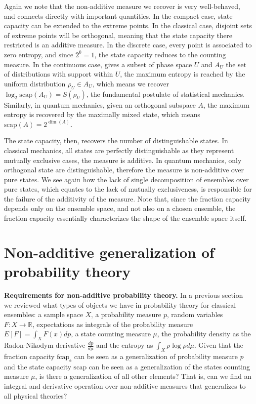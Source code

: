 \documentclass[10pt,twocolumn, nofootinbib]{revtex4-2}
\newcommand\capacity{\mathrm{scap}}
\newcommand\frcap{\mathrm{fcap}}
\newcommand{\ens}[1][e] {\mathsf{#1}} %
\begin{document}
Again we note that the non-additive measure we recover is very well-behaved, and connects directly with important quantities. In the compact case, state capacity can be extended to the extreme points. In the classical case, disjoint sets of extreme points will be orthogonal, meaning that the state capacity there restricted is an additive measure. In the discrete case, every point is associated to zero entropy, and since $2^0=1$, the state capacity reduces to the counting measure. In the continuous case, gives a subset of phase space $U$ and $A_U$ the set of distributions with support within $U$, the maximum entropy is reached by the uniform distribution $\rho_U \in A_U$, which means we recover $\log_2 \capacity(A_U) = S(\rho_U)$, the fundamental postulate of statistical mechanics. Similarly, in quantum mechanics, given an orthogonal subspace $A$, the maximum entropy is recovered by the maximally mixed state, which means $\capacity(A) = 2^{\dim(A)}$.

The state capacity, then, recovers the number of distinguishable states. In classical mechanics, all states are perfectly distinguishable as they represent mutually exclusive cases, the measure is additive. In quantum mechanics, only orthogonal state are distinguishable, therefore the measure is non-additive over pure states. We see again how the lack of single decomposition of ensembles over pure states, which equates to the lack of mutually exclusiveness, is responsible for the failure of the additivity of the measure. Note that, since the fraction capacity depends only on the ensemble space, and not also on a chosen ensemble, the fraction capacity essentially characterizes the shape of the ensemble space itself.

\section{Non-additive generalization of probability theory}

\textbf{Requirements for non-additive probability theory.} In a previous section we reviewed what types of objects we have in probability theory for classical ensembles: a sample space $X$, a probability measure $p$, random variables $F : X \to \mathbb{R}$, expectations as integrals of the probability measure $E[F] = \int_X F(x) dp$, a state counting measure $\mu$, the probability density as the Radon-Nikodym derivative $\frac{dp}{d\mu}$ and the entropy as $\int_X \rho \log \rho d\mu$.  Given that the fraction capacity $\frcap_{\ens}$ can be seen as a generalization of probability measure $p$ and the state capacity $\capacity$ can be seen as a generalization of the states counting measure $\mu$, is there a generalization of all other elements? That is, can we find an integral and derivative operation over non-additive measures that generalizes to all physical theories?
\end{document}
